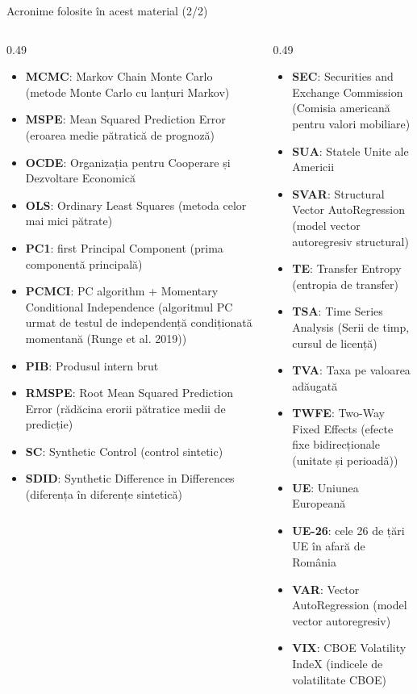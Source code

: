 \begin{frame}{Acronime folosite în acest material (2/2)}
\begin{columns}[T]
\begin{column}{0.49\textwidth}
\begin{itemize}\setlength{\itemsep}{0pt}
    \item \textbf{MCMC}: Markov Chain Monte Carlo (metode Monte Carlo cu lanțuri Markov)
    \item \textbf{MSPE}: Mean Squared Prediction Error (eroarea medie pătratică de prognoză)
    \item \textbf{OCDE}: Organizația pentru Cooperare și Dezvoltare Economică
    \item \textbf{OLS}: Ordinary Least Squares (metoda celor mai mici pătrate)
    \item \textbf{PC1}: first Principal Component (prima componentă principală)
    \item \textbf{PCMCI}: PC algorithm + Momentary Conditional Independence (algoritmul PC urmat de testul de independență condiționată momentană (Runge et al. 2019))
    \item \textbf{PIB}: Produsul intern brut
    \item \textbf{RMSPE}: Root Mean Squared Prediction Error (rădăcina erorii pătratice medii de predicție)
    \item \textbf{SC}: Synthetic Control (control sintetic)
    \item \textbf{SDID}: Synthetic Difference in Differences (diferența în diferențe sintetică)
\end{itemize}
\end{column}
\begin{column}{0.49\textwidth}
\begin{itemize}\setlength{\itemsep}{0pt}
    \item \textbf{SEC}: Securities and Exchange Commission (Comisia americană pentru valori mobiliare)
    \item \textbf{SUA}: Statele Unite ale Americii
    \item \textbf{SVAR}: Structural Vector AutoRegression (model vector autoregresiv structural)
    \item \textbf{TE}: Transfer Entropy (entropia de transfer)
    \item \textbf{TSA}: Time Series Analysis (Serii de timp, cursul de licență)
    \item \textbf{TVA}: Taxa pe valoarea adăugată
    \item \textbf{TWFE}: Two-Way Fixed Effects (efecte fixe bidirecționale (unitate și perioadă))
    \item \textbf{UE}: Uniunea Europeană
    \item \textbf{UE-26}: cele 26 de țări UE în afară de România
    \item \textbf{VAR}: Vector AutoRegression (model vector autoregresiv)
    \item \textbf{VIX}: CBOE Volatility IndeX (indicele de volatilitate CBOE)
\end{itemize}
\end{column}
\end{columns}
\end{frame}

